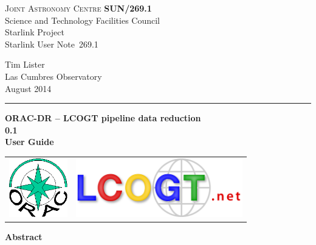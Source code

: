 \documentclass[twoside,11pt]{article}
\newcommand{\stardoccategory}  {Starlink User Note}
\newcommand{\stardocinitials}  {SUN}
\newcommand{\stardocnumber}    {269.1}
\newcommand{\stardocauthors}   {Tim Lister \\
                                Las Cumbres Observatory}
\newcommand{\stardocdate}      {August 2014}
\newcommand{\stardoctitle}     {ORAC-DR -- LCOGT pipeline data reduction}
\newcommand{\stardocversion}   {0.1}
\newcommand{\stardocmanual}    {User Guide}
\newcommand{\stardocname}{\stardocinitials /\stardocnumber}
\newenvironment{latexonly}{}{}
\renewcommand{\_}{\texttt{\symbol{95}}}
\begin{document}
\setcounter{secnumdepth}{5}
\thispagestyle{empty}

\begin{latexonly}
   \textsc{Joint Astronomy Centre} \hfill \textbf{\stardocname}\\
   {\large Science and Technology Facilities Council}\\
   {\large Starlink Project\\ }
   {\large \stardoccategory\ \stardocnumber}
   \begin{flushright}
   \stardocauthors\\
   \stardocdate
   \end{flushright}
   \vspace{-4mm}
   \rule{\textwidth}{0.5mm}
   \vspace{5mm}
   \begin{center}
   {\Huge\textbf{\stardoctitle \\ [2.5ex]}}
   {\LARGE\textbf{\stardocversion \\ [4ex]}}
   {\Huge\textbf{\stardocmanual}}
   \end{center}
   \vspace{5mm}

\begin{center}
\begin{tabular}{cc}
\includegraphics[width=1.0in]{sun260_logo} & 
\includegraphics[height=1.0in]{sun269_logo} \\
\end{tabular}
\end{center}

   \vspace{10mm}
   \begin{center}
      {\Large\textbf{Abstract}}
   \end{center}
\end{latexonly}
\end{document}
